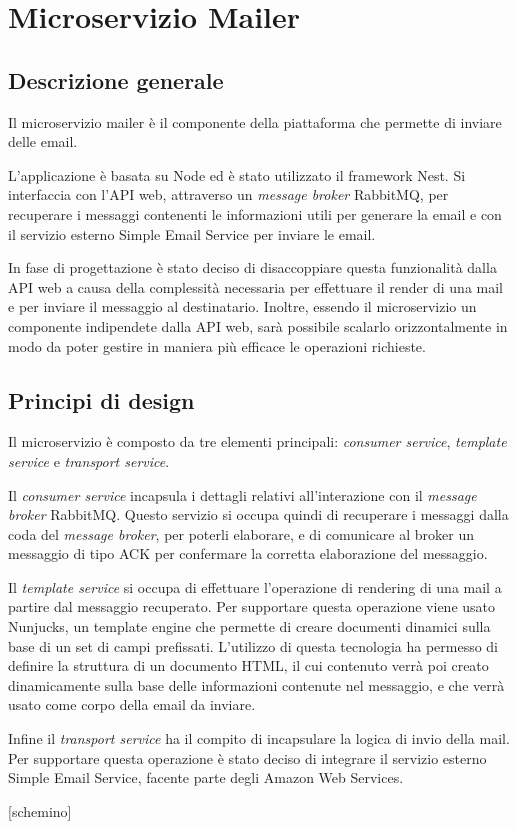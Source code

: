 
\section{Microservizio Mailer}
\subsection{Descrizione generale}
Il microservizio mailer è il componente della piattaforma che permette di inviare delle email.

L'applicazione è basata su Node ed è stato utilizzato il framework Nest.
Si interfaccia con l'API web, attraverso un \textit{message broker} RabbitMQ, per recuperare i messaggi contenenti le informazioni utili per generare la email e con il servizio esterno Simple Email Service per inviare le email.

In fase di progettazione è stato deciso di disaccoppiare questa funzionalità dalla API web a causa della complessità necessaria per effettuare il render di una mail e per inviare il messaggio al destinatario.
Inoltre, essendo il microservizio un componente indipendete dalla API web, sarà possibile scalarlo orizzontalmente in modo da poter gestire in maniera più efficace le operazioni richieste.

\subsection{Principi di design}
Il microservizio è composto da tre elementi principali: \textit{consumer service}, \textit{template service} e \textit{transport service}.

Il \textit{consumer service} incapsula i dettagli relativi all'interazione con il \textit{message broker} RabbitMQ. Questo servizio si occupa quindi di recuperare i messaggi dalla coda del \textit{message broker}, per poterli elaborare, e di comunicare
al broker un messaggio di tipo ACK per confermare la corretta elaborazione del messaggio.

Il \textit{template service} si occupa di effettuare l'operazione di rendering di una mail a partire dal messaggio recuperato. Per supportare questa operazione viene usato Nunjucks, un template engine che permette di creare documenti dinamici
sulla base di un set di campi prefissati. L'utilizzo di questa tecnologia ha permesso di definire la struttura di un documento HTML, il cui contenuto verrà poi creato dinamicamente sulla base delle informazioni contenute nel messaggio, e che
verrà usato come corpo della email da inviare.

Infine il \textit{transport service} ha il compito di incapsulare la logica di invio della mail. Per supportare questa operazione è stato deciso di integrare il servizio esterno Simple Email Service, facente parte degli Amazon Web Services.

    [schemino]


